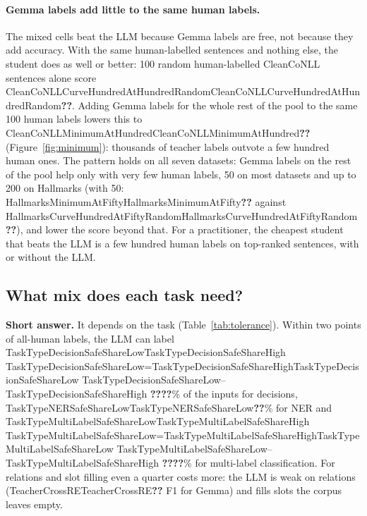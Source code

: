 \documentclass[11pt]{article}
\newcommand{\res}[1]{\ifcsname #1\endcsname\csname #1\endcsname\else\textbf{??}\fi}
\newcommand{\resrange}[2]{\ifcsname #1\endcsname\ifcsname #2\endcsname
  \ifnum\csname #1\endcsname=\csname #2\endcsname\relax\csname #1\endcsname
  \else\csname #1\endcsname--\csname #2\endcsname\fi
  \else\textbf{??}\fi\else\textbf{??}\fi}
\newcommand{\answer}[1]{\noindent\textbf{Short answer.} #1\par\medskip}
\begin{document}
\paragraph{Gemma labels add little to the same human labels.} The mixed cells beat the LLM because Gemma labels are free, not because they add accuracy. With the same human-labelled sentences and nothing else, the student does as well or better: 100 random human-labelled CleanCoNLL sentences alone score \res{CleanCoNLLCurveHundredAtHundredRandom}. Adding Gemma labels for the whole rest of the pool to the same 100 human labels lowers this to \res{CleanCoNLLMinimumAtHundred} (Figure~\ref{fig:minimum}): thousands of teacher labels outvote a few hundred human ones. The pattern holds on all seven datasets: Gemma labels on the rest of the pool help only with very few human labels, 50 on most datasets and up to 200 on Hallmarks (with 50: \res{HallmarksMinimumAtFifty} against \res{HallmarksCurveHundredAtFiftyRandom}), and lower the score beyond that. For a practitioner, the cheapest student that beats the LLM is a few hundred human labels on top-ranked sentences, with or without the LLM.

\subsection{What mix does each task need?}
\label{sec:tolerance}

\answer{It depends on the task (Table~\ref{tab:tolerance}). Within two points of all-human labels, the LLM can label \resrange{TaskTypeDecisionSafeShareLow}{TaskTypeDecisionSafeShareHigh}\% of the inputs for decisions, \res{TaskTypeNERSafeShareLow}\% for NER and \resrange{TaskTypeMultiLabelSafeShareLow}{TaskTypeMultiLabelSafeShareHigh}\% for multi-label classification. For relations and slot filling even a quarter costs more: the LLM is weak on relations (\res{TeacherCrossRE} F1 for Gemma) and fills slots the corpus leaves empty.}

\begin{table}[t]
\centering
\small

\caption{How much LLM labelling each task tolerates, from 1{,}000 ranked inputs (test F1, seed means). T/S: the teacher's own test F1 divided by the F1 of the student trained on the same inputs with human labels; it compares a teacher with a student, not with human annotators. 25\% to 100\%: points lost against all human labels when the LLM labels that share of the inputs (negative: a gain). Safe: the largest LLM share, walking up from 25\%, that loses at most two points. Beat: the smallest human share whose student beats the teacher (none: no share does). Descriptive; read from the test grid.}
\label{tab:tolerance}
\end{table}
\end{document}
